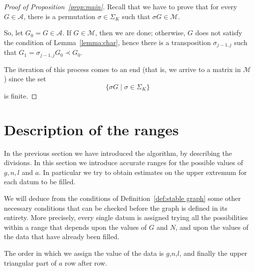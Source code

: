 \documentclass{amsart}
\theoremstyle{plain}
\theoremstyle{definition}
\newtheorem{notation}[theorem]{Notation}
\DeclareMathOperator{\MAX}{max}
\begin{document}
\begin{proof}[Proof of Proposition~\ref{prop:main}]
  Recall that we have to prove that for every $G \in \mathcal{A}$,
  there is a permutation $\sigma \in \Sigma_K$ such that $\sigma G \in
  \mathcal{M}$.

  So, let $G_0 = G \in \mathcal{A}$. If $G \in \mathcal{M}$, then we
  are done; otherwise, $G$ does not satisfy the condition of
  Lemma~\ref{lemma:char}, hence there is a transposition $\sigma_{j-1,
    j}$ such that $G_1 = \sigma_{j-1,j} G_0 \prec G_0$.

  The iteration of this process comes to an end (that is, we arrive to
  a matrix in $\mathcal{M}$) since the set
  \[
  \bigl\{ \sigma G \mid \sigma \in \Sigma_K\bigr\}
  \]
  is finite.
\end{proof}



\section{Description of the ranges}\label{sec:ranges}

In the previous section we have introduced the algorithm, by
describing the divisions. In this section we introduce accurate ranges
for the possible values of $g,n,l$ and $a$. In particular we try to
obtain estimates on the upper extremum for each datum to be filled.

We will deduce from the conditions of Definition~\ref{def:stable
  graph} some other necessary conditions that can be checked before
the graph is defined in its entirety. More precisely, every single
datum is assigned trying all the possibilities within a range that
depends upon the values of $G$ and $N$, and upon the values of the
data that have already been filled.

The order in which we assign the value of the data is $g$,$n$,$l$, and
finally the upper triangular part of $a$ row after row.

\end{document}
